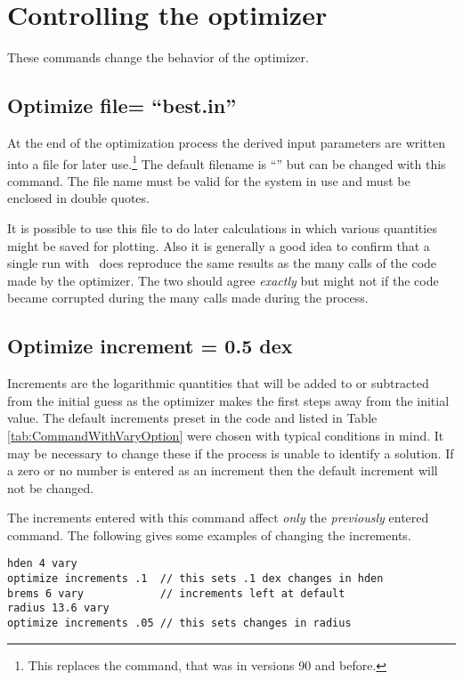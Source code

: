 \section{Controlling the optimizer}
\label{sec:controlling_optimizer}

These commands change the behavior of the optimizer.

\subsection{Optimize file= ``best.in''}

At the end of the optimization process the derived input parameters are
written into a file for later use.\footnote{This replaces the  command, that was in versions 90
and before.}  The default filename is
``'' but can be changed with this command.
The file name must
be valid for the system in use and must be enclosed in double quotes.

It is possible to use this file to do later calculations in which various
quantities might be saved for plotting.
Also it is generally a good idea
to confirm that a single run with \Cloudy\ does reproduce the same results
as the many calls of the code made by the optimizer.
The two should agree
\emph{exactly} but might not if the code became corrupted
during the many calls
made during the process.

\subsection{Optimize increment = 0.5 dex}

Increments are the logarithmic quantities that will be added to or
subtracted from the initial guess as the optimizer makes the first steps
away from the initial value.
The default increments preset in the code
and listed in Table \ref{tab:CommandWithVaryOption} were chosen with
typical conditions in mind.
It may be necessary to change these if the process is
unable to identify
a solution.
If a zero or no number is entered as an increment then
the default increment will not be changed.

The increments entered with this command affect
\emph{only} the \emph{previously}
entered  command.
The following gives some examples of changing the
increments.
\begin{verbatim}
hden 4 vary
optimize increments .1  // this sets .1 dex changes in hden
brems 6 vary            // increments left at default
radius 13.6 vary
optimize increments .05 // this sets changes in radius
\end{verbatim}

